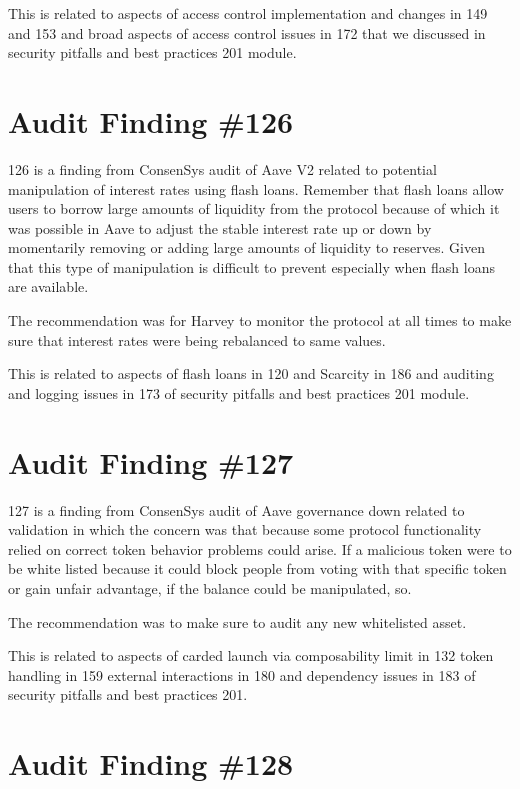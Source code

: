 This is related to aspects of access control implementation and changes in 149 and 153 and broad aspects of access control issues in 172 that we discussed in security pitfalls and best practices 201 module.

\section{Audit Finding \#126}

126 is a finding from ConsenSys audit of Aave V2 related to potential manipulation of interest rates using flash loans. Remember that flash loans allow users to borrow large amounts of liquidity from the protocol because of which it was possible in Aave to adjust the stable interest rate up or down by momentarily removing or adding large amounts of liquidity to reserves. Given that this type of manipulation is difficult to prevent especially when flash loans are available.

The recommendation was for Harvey to monitor the protocol at all times to make sure that interest rates were being rebalanced to same values.

This is related to aspects of flash loans in 120 and Scarcity in 186 and auditing and logging issues in 173 of security pitfalls and best practices 201 module.

\section{Audit Finding \#127}

127 is a finding from ConsenSys audit of Aave governance down related to validation in which the concern was that because some protocol functionality relied on correct token behavior problems could arise. If a malicious token were to be white listed because it could block people from voting with that specific token or gain unfair advantage, if the balance could be manipulated, so.

The recommendation was to make sure to audit any new whitelisted asset.

This is related to aspects of carded launch via composability limit in 132 token handling in 159 external interactions in 180 and dependency issues in 183 of security pitfalls and best practices 201.

\section{Audit Finding \#128}

